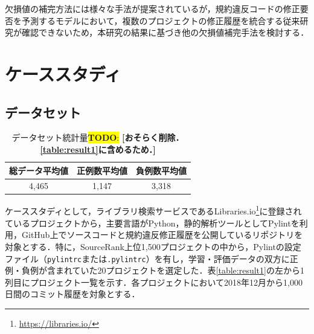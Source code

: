 \documentclass[submit]{ipsj}
\newcommand{\todo}[1]{\colorbox{yellow}{{\bf TODO}:}{\color{red} {\textbf{[#1]}}}}
\begin{document}
欠損値の補完方法には様々な手法が提案されているが，規約違反コードの修正要否を予測するモデルにおいて，複数のプロジェクトの修正履歴を統合する従来研究が確認できないため，本研究の結果に基づき他の欠損値補完手法を検討する．



\section{ケーススタディ}\label{chap:result}

\subsection{データセット}

\begin{table}[t]
    \centering
    \caption{データセット統計量\todo{おそらく削除．\ref{table:result1}に含めるため．}}
    \label{tab:dataset_statistics}
    \begin{tabular}{ccc}
        \toprule
        総データ平均値 & 正例数平均値 & 負例数平均値 \\
        \midrule
        4,465 & 1,147 & 3,318 \\
        \bottomrule
    \end{tabular}
\end{table}

ケーススタディとして，ライブラリ検索サービスであるLibraries.io\footnote{\url{https://libraries.io/}}に登録されているプロジェクトから，主要言語がPython，静的解析ツールとしてPylintを利用，GitHub上でソースコードと規約違反修正履歴を公開しているリポジトリを対象とする．特に，SourceRank上位1,500プロジェクトの中から，Pylintの設定ファイル（\texttt{pylintrc}または\texttt{.pylintrc}）を有し，学習・評価データの双方に正例・負例が含まれていた20プロジェクトを選定した．表\ref{table:result1}の左から1列目にプロジェクト一覧を示す．各プロジェクトにおいて2018年12月から1,000日間のコミット履歴を対象とする．


\end{document}
